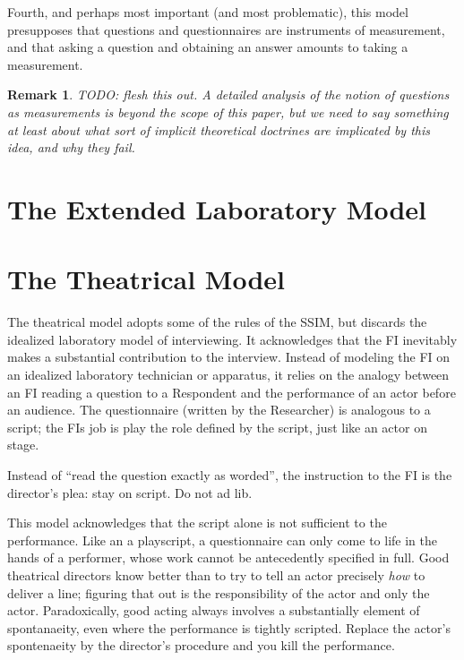 \documentclass[11pt,twoside]{article}
\newtheorem{remark}{Remark}
\begin{document}
Fourth, and perhaps most important (and most problematic), this model
presupposes that questions and questionnaires are instruments of
measurement, and that asking a question and obtaining an answer
amounts to taking a measurement.

\begin{remark}
  TODO: flesh this out.  A detailed analysis of the notion of
  questions as measurements is beyond the scope of this paper, but we
  need to say something at least about what sort of implicit
  theoretical doctrines are implicated by this idea, and why they
  fail.
\end{remark}

\section{The Extended Laboratory Model}

\section{The Theatrical Model}

The theatrical model adopts some of the rules of the SSIM, but
discards the idealized laboratory model of interviewing.  It
acknowledges that the FI inevitably makes a substantial contribution
to the interview.  Instead of modeling the FI on an idealized
laboratory technician or apparatus, it relies on the analogy between
an FI reading a question to a Respondent and the performance of an
actor before an audience.  The questionnaire (written by the
Researcher) is analogous to a script; the FIs job is play the role
defined by the script, just like an actor on stage.

Instead of ``read the question exactly as worded'', the instruction to
the FI is the director's plea: stay on script.  Do not ad lib.

This model acknowledges that the script alone is not sufficient to the
performance.  Like an a playscript, a questionnaire can only come to
life in the hands of a performer, whose work cannot be antecedently
specified in full.  Good theatrical directors know better than to try
to tell an actor precisely \textit{how} to deliver a line; figuring
that out is the responsibility of the actor and only the actor.
Paradoxically, good acting always involves a substantially element of
spontanaeity, even where the performance is tightly scripted.  Replace
the actor's spontenaeity by the director's procedure and you kill the
performance.
\end{document}
